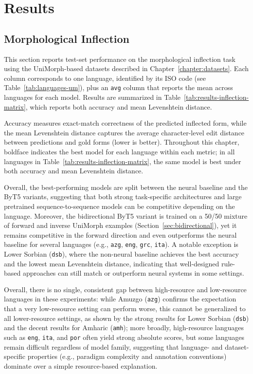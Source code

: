 \chapter{Results}\label{chapter:results}

\section{Morphological Inflection}

This section reports test-set performance on the morphological inflection task using the UniMorph-based datasets described in Chapter~\ref{chapter:datasets}. Each column corresponds to one language, identified by its ISO code (see Table~\ref{tab:languages-um}), plus an \texttt{avg} column that reports the mean across languages for each model. Results are summarized in Table~\ref{tab:results-inflection-matrix}, which reports both accuracy and mean Levenshtein distance.


Accuracy measures exact-match correctness of the predicted inflected form, while the mean Levenshtein distance captures the average character-level edit distance between predictions and gold forms (lower is better). Throughout this chapter, boldface indicates the best model for each language within each metric; in all languages in Table~\ref{tab:results-inflection-matrix}, the same model is best under both accuracy and mean Levenshtein distance.

Overall, the best-performing models are split between the neural baseline and the ByT5 variants, suggesting that both strong task-specific architectures and large pretrained sequence-to-sequence models can be competitive depending on the language. Moreover, the bidirectional ByT5 variant is trained on a 50/50 mixture of forward and inverse UniMorph examples (Section~\ref{sec:bidirectional}), yet it remains competitive in the forward direction and even outperforms the neural baseline for several languages (e.g., \texttt{azg}, \texttt{eng}, \texttt{grc}, \texttt{ita}). A notable exception is Lower Sorbian (\texttt{dsb}), where the non-neural baseline achieves the best accuracy and the lowest mean Levenshtein distance, indicating that well-designed rule-based approaches can still match or outperform neural systems in some settings.

Overall, there is no single, consistent gap between high-resource and low-resource languages in these experiments: while Amuzgo (\texttt{azg}) confirms the expectation that a very low-resource setting can perform worse, this cannot be generalized to all lower-resource settings, as shown by the strong results for Lower Sorbian (\texttt{dsb}) and the decent results for Amharic (\texttt{amh}); more broadly, high-resource languages such as \texttt{eng}, \texttt{ita}, and \texttt{por} often yield strong absolute scores, but some languages remain difficult regardless of model family, suggesting that language- and dataset-specific properties (e.g., paradigm complexity and annotation conventions) dominate over a simple resource-based explanation.

